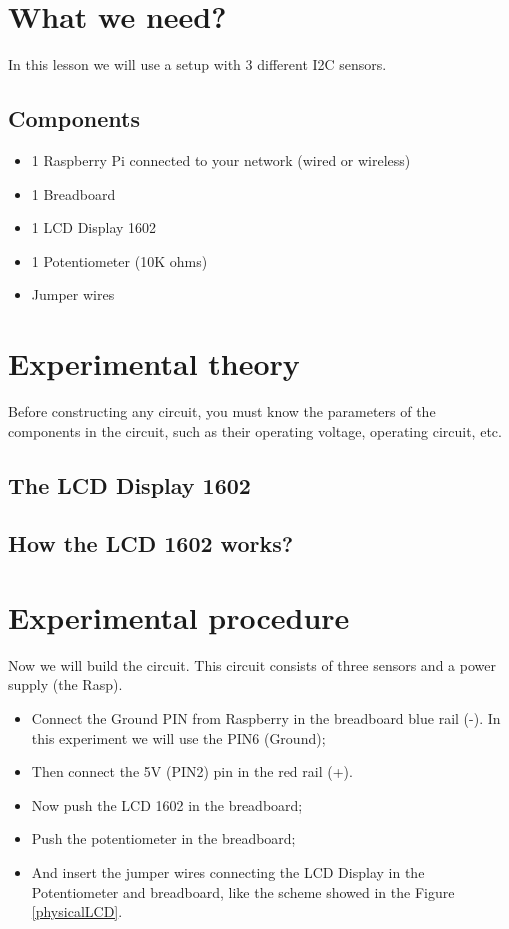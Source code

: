 \documentclass[10pt,twoside,english]{_support/latex/sbabook/sbabook}
\begin{document}
\section{What we need?}
In this lesson we will use a setup with 3 different I2C sensors.
\subsection{Components}
\begin{itemize}
\item 1 Raspberry Pi connected to your network (wired or wireless)
\item 1 Breadboard
\item 1 LCD Display 1602 
\item 1 Potentiometer (10K ohms)
\item Jumper wires
\end{itemize}
\section{Experimental theory}
Before constructing any circuit, you must know the parameters of the components in the circuit, such as their operating voltage, operating circuit, etc.
\subsection{The LCD Display 1602}\subsection{How the LCD 1602 works?}\section{Experimental procedure}
Now we will build the circuit. This circuit consists of three sensors and a power supply (the Rasp).

\begin{itemize}
\item Connect the Ground PIN from Raspberry in the breadboard blue rail (-). In this experiment we will use the PIN6 (Ground);
\item Then connect the 5V (PIN2) pin in the red rail (+). 
\item Now push the LCD 1602 in the breadboard;
\item Push the potentiometer in the breadboard;
\item And insert the jumper wires connecting the LCD Display in the Potentiometer and breadboard, like the scheme showed in the Figure \ref{physicalLCD}.
\end{itemize}
\end{document}
